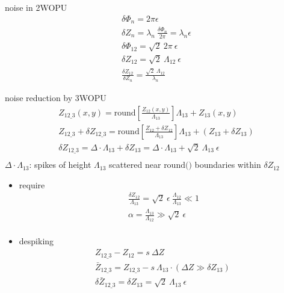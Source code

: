 \documentclass[t, aspectratio=169]{beamer}
\begin{document}
\begin{frame}{noise in 2WOPU}
	\begin{gather*}
\delta\Phi_n = 2\pi\epsilon \\
\delta Z_n = \lambda_n\ \frac{\delta\Phi_n}{2\pi} = \lambda_n\epsilon \\
\delta\Phi_{12} = \sqrt{2}\ 2\pi\ \epsilon \\
\delta Z_{12} = \sqrt{2}\ \Lambda_{12}\ \epsilon \\
\frac{\delta Z_{12}}{\delta Z_n} = \frac{\sqrt{2}\ \Lambda_{12}}{\lambda_n}
	\end{gather*}
\end{frame}


\begin{frame}[allowframebreaks]{noise reduction by 3WOPU}
	\begin{gather*}
Z_{12\_3}(x,y) = \textrm{round}\left[\frac{Z_{12}(x,y)}{\Lambda_{13}}\right] \Lambda_{13} + Z_{13}(x,y) \\
Z_{12\_3} + \delta Z_{12\_3} = \textrm{round}\left[\frac{Z_{12} + \delta Z_{12}}{\Lambda_{13}} \right] \Lambda_{13} + (Z_{13} + \delta Z_{13}) \\
\delta Z_{12\_3} = \Delta\cdot \Lambda_{13} + \delta Z_{13} = \Delta\cdot\Lambda_{13} + \sqrt{2}\ \Lambda_{13}\ \epsilon \\
	\end{gather*}
$\Delta\cdot\Lambda_{13}$: 		spikes of height $\Lambda_{13}$ scattered near $\textrm{round()}$ boundaries within $\delta Z_{12}$ \\
	\begin{itemize}
		\item require
		\begin{gather*}
\frac{\delta Z_{12}}{\Lambda_{13}} = \sqrt{2}\ \epsilon\ \frac{\Lambda_{12}}{\Lambda_{13}} \ll 1 \\
\alpha = \frac{\Lambda_{13}}{\Lambda_{12}} \gg \sqrt{2}\ \epsilon \\
		\end{gather*}
		\item despiking
		\begin{gather*}
Z_{12\_3} - Z_{12} = s\ \Delta Z \\
\bar{Z}_{12\_3} = Z_{12\_3} - s\ \Lambda_{13}\cdot\left(\Delta Z \gg \delta Z_{13}\right)\  \\
\delta\bar{Z}_{12\_3} = \delta Z_{13} = \sqrt{2}\ \Lambda_{13}\ \epsilon
		\end{gather*}
	\end{itemize}
\end{frame}
\end{document}
